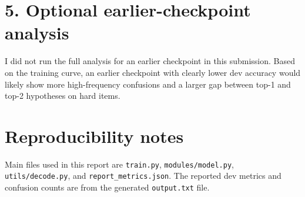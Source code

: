 \documentclass[11pt]{article}
\begin{document}
\section*{5. Optional earlier-checkpoint analysis}
I did not run the full analysis for an earlier checkpoint in this submission.
Based on the training curve, an earlier checkpoint with clearly lower dev accuracy would likely show more high-frequency confusions and a larger gap between top-1 and top-2 hypotheses on hard items.

\section*{Reproducibility notes}
Main files used in this report are \texttt{train.py}, \texttt{modules/model.py}, \texttt{utils/decode.py}, and \texttt{report\_metrics.json}.
The reported dev metrics and confusion counts are from the generated \texttt{output.txt} file.
\end{document}
